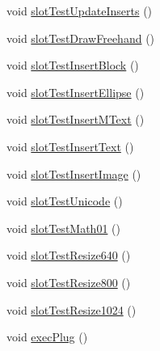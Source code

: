 \begin{DoxyCompactItemize}
\item 
void \hyperlink{classQC__ApplicationWindow_ad81476e42eb080ff563b1b02ad738789}{slot\-Test\-Update\-Inserts} ()
\item 
void \hyperlink{classQC__ApplicationWindow_a470d1fe8e96c580473738a7a89056139}{slot\-Test\-Draw\-Freehand} ()
\item 
void \hyperlink{classQC__ApplicationWindow_ab4598fe31c88107e2123df0070623808}{slot\-Test\-Insert\-Block} ()
\item 
void \hyperlink{classQC__ApplicationWindow_a9e6b79d49ac25ab20b03097835c2253a}{slot\-Test\-Insert\-Ellipse} ()
\item 
void \hyperlink{classQC__ApplicationWindow_a090a76a2be923a3dfe41a2f8af30d38f}{slot\-Test\-Insert\-M\-Text} ()
\item 
void \hyperlink{classQC__ApplicationWindow_a6c3e30be7f31bd1fdfc28075982595d2}{slot\-Test\-Insert\-Text} ()
\item 
void \hyperlink{classQC__ApplicationWindow_a9320cf7f05f17b67c9b2a139100721cf}{slot\-Test\-Insert\-Image} ()
\item 
void \hyperlink{classQC__ApplicationWindow_af0a6abbe48e02bdafce0871509740749}{slot\-Test\-Unicode} ()
\item 
void \hyperlink{classQC__ApplicationWindow_a67646968336f544014014184f39ca8af}{slot\-Test\-Math01} ()
\item 
void \hyperlink{classQC__ApplicationWindow_ac4283f489e42e73382ddbc0bd0db13fd}{slot\-Test\-Resize640} ()
\item 
void \hyperlink{classQC__ApplicationWindow_a0f6ac204f1714af3ac0d8ab5b2257e99}{slot\-Test\-Resize800} ()
\item 
void \hyperlink{classQC__ApplicationWindow_ab07c29d58563e9d44bc20146c7593abb}{slot\-Test\-Resize1024} ()
\item 
void \hyperlink{classQC__ApplicationWindow_ab160c9acff58041fec284ed714badf7b}{exec\-Plug} ()
\end{DoxyCompactItemize}
